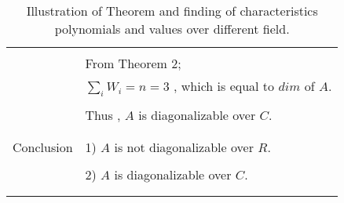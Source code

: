 \documentclass[journal,12pt]{IEEEtran}
\begin{document}
\begin{longtable}{|l|l|}
&\\
& From Theorem 2;\\
& $\sum_{i} W_i = n = 3$ , which is equal to $dim$ of $A$.\\
&\\
& Thus , $A$ is diagonalizable over $C$.\\
&\\
\hline
\multirow{3}{*}{Conclusion} & \\
& 1) $A$ is not diagonalizable over $R$. \\
&\\
& 2) $A$ is diagonalizable over $C$.\\
&\\
\hline
\caption{Illustration of Theorem and finding of characteristics polynomials and values  over different field.}
\label{table:1}
\end{longtable}
\end{document}
